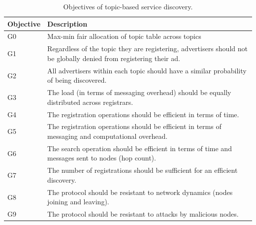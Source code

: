 \begin{table} \centering
\caption{Objectives of topic-based service discovery.}
\label{tab:objectives}
\renewcommand{\arraystretch}{1.5}
\renewcommand{\tabcolsep}{0.5em}
\centering
\scriptsize{
\begin{tabular}   {p{1cm}p{6cm}} 
\toprule
\textbf{Objective} & \textbf{Description} \\
\hline
G0 & Max-min fair allocation of topic table across topics \\
\hline
G1 & Regardless of the topic they are registering, advertisers should not be globally denied from registering their ad. \\
\hline
G2 & All advertisers within each topic should have a similar probability of being discovered. \\
\hline
G3 & The load (in terms of messaging overhead) should be equally distributed across registrars. \\
\hline
G4 & The registration operations should be efficient in terms of time. \\
\hline
G5 & The registration operations should be efficient in terms of messaging and computational overhead. \\
\hline 
G6 & The search operation should be efficient in terms of time and messages sent to nodes (hop count). \\
\hline
G7 & The number of registrations should be sufficient for an efficient discovery. \\
\hline
G8 & The protocol should be resistant to network dynamics (nodes joining and leaving). \\
\hline 
G9 & The protocol should be resistant to attacks by malicious nodes. \\
\hline
\end{tabular}
}
\vspace{-0.2in}
\end{table}


\iffalse
